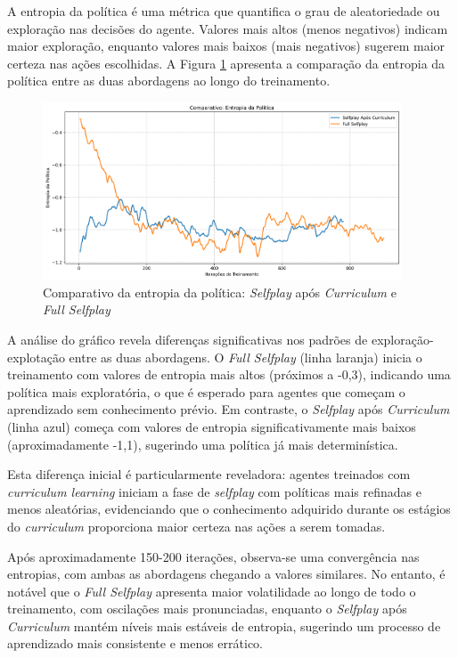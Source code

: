 A entropia da política é uma métrica que quantifica o grau de aleatoriedade ou exploração nas decisões do agente. Valores mais altos (menos negativos) indicam maior exploração, enquanto valores mais baixos (mais negativos) sugerem maior certeza nas ações escolhidas. A Figura \ref{fig:policy_entropy} apresenta a comparação da entropia da política entre as duas abordagens ao longo do treinamento.

\begin{figure}[H]
    \centering
    \includegraphics[width=0.95\textwidth]{fig/graficos_trabalho/graficos_experimentos/geral/comparativo_entropia_politica.png}
    \caption{Comparativo da entropia da política: \textit{Selfplay} após \textit{Curriculum} e \textit{Full Selfplay}}
    \label{fig:policy_entropy}
\end{figure}

A análise do gráfico revela diferenças significativas nos padrões de exploração-explotação entre as duas abordagens. O \textit{Full Selfplay} (linha laranja) inicia o treinamento com valores de entropia mais altos (próximos a -0,3), indicando uma política mais exploratória, o que é esperado para agentes que começam o aprendizado sem conhecimento prévio. Em contraste, o \textit{Selfplay} após \textit{Curriculum} (linha azul) começa com valores de entropia significativamente mais baixos (aproximadamente -1,1), sugerindo uma política já mais determinística.

Esta diferença inicial é particularmente reveladora: agentes treinados com \textit{curriculum learning} iniciam a fase de \textit{selfplay} com políticas mais refinadas e menos aleatórias, evidenciando que o conhecimento adquirido durante os estágios do \textit{curriculum} proporciona maior certeza nas ações a serem tomadas.

Após aproximadamente 150-200 iterações, observa-se uma convergência nas entropias, com ambas as abordagens chegando a valores similares. No entanto, é notável que o \textit{Full Selfplay} apresenta maior volatilidade ao longo de todo o treinamento, com oscilações mais pronunciadas, enquanto o \textit{Selfplay} após \textit{Curriculum} mantém níveis mais estáveis de entropia, sugerindo um processo de aprendizado mais consistente e menos errático.


